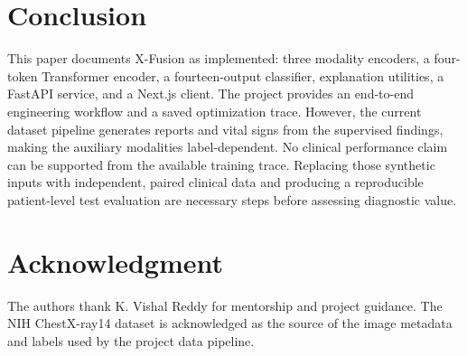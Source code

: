 \documentclass[conference]{IEEEtran}
\begin{document}
\section{Conclusion}
This paper documents X-Fusion as implemented: three modality encoders, a four-token Transformer encoder, a fourteen-output classifier, explanation utilities, a FastAPI service, and a Next.js client. The project provides an end-to-end engineering workflow and a saved optimization trace. However, the current dataset pipeline generates reports and vital signs from the supervised findings, making the auxiliary modalities label-dependent. No clinical performance claim can be supported from the available training trace. Replacing those synthetic inputs with independent, paired clinical data and producing a reproducible patient-level test evaluation are necessary steps before assessing diagnostic value.

\section*{Acknowledgment}
The authors thank K. Vishal Reddy for mentorship and project guidance. The NIH ChestX-ray14 dataset is acknowledged as the source of the image metadata and labels used by the project data pipeline.
\end{document}
